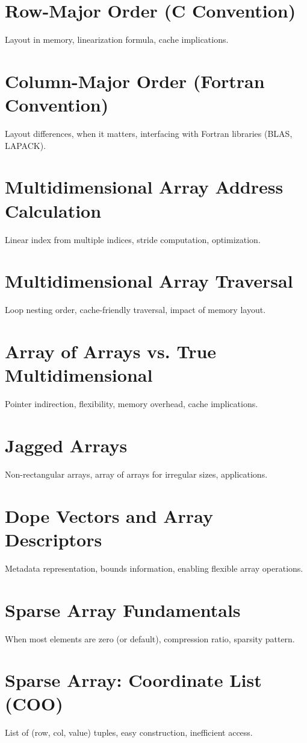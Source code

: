 \chapter{Row-Major Order (C Convention)}
Layout in memory, linearization formula, cache implications.

\chapter{Column-Major Order (Fortran Convention)}
Layout differences, when it matters, interfacing with Fortran libraries (BLAS, LAPACK).

\chapter{Multidimensional Array Address Calculation}
Linear index from multiple indices, stride computation, optimization.

\chapter{Multidimensional Array Traversal}
Loop nesting order, cache-friendly traversal, impact of memory layout.

\chapter{Array of Arrays vs. True Multidimensional}
Pointer indirection, flexibility, memory overhead, cache implications.

\chapter{Jagged Arrays}
Non-rectangular arrays, array of arrays for irregular sizes, applications.

\chapter{Dope Vectors and Array Descriptors}
Metadata representation, bounds information, enabling flexible array operations.

\chapter{Sparse Array Fundamentals}
When most elements are zero (or default), compression ratio, sparsity pattern.

\chapter{Sparse Array: Coordinate List (COO)}
List of (row, col, value) tuples, easy construction, inefficient access.

